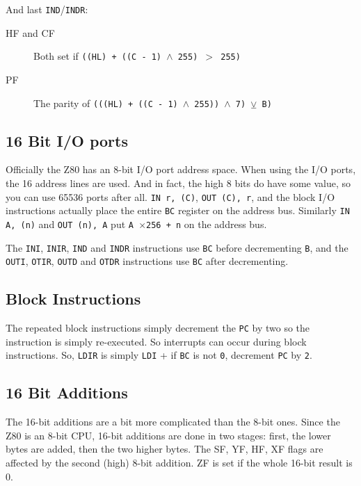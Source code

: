 And last {\tt IND}/{\tt INDR}:

\begin{description}

	\item[HF and CF]
	Both set if {\tt ((HL) + ((C - 1) $\wedge$ 255) $>$ 255)}

	\item[PF]
	The parity of {\tt (((HL) + ((C - 1) $\wedge$ 255)) $\wedge$ 7) $\veebar$ B)}

\end{description}


\subsection{16 Bit I/O ports}

Officially the Z80 has an 8-bit I/O port address space. When using the I/O ports, the 16 address lines are used. And in fact, the high 8 bits do have some value, so you can use 65536 ports after all. {\tt IN r, (C)}, {\tt OUT (C), r}, and the block I/O instructions actually place the entire {\tt BC} register on the address bus. Similarly {\tt IN A, (n)} and {\tt OUT (n), A} put {\tt A $\times$256 + n} on the address bus.

The {\tt INI}, {\tt INIR}, {\tt IND} and {\tt INDR} instructions use {\tt BC} before decrementing {\tt B}, and the {\tt OUTI}, {\tt OTIR}, {\tt OUTD} and {\tt OTDR} instructions use {\tt BC} after decrementing.


\subsection{Block Instructions}

The repeated block instructions simply decrement the {\tt PC} by two so the instruction is simply re-executed. So interrupts can occur during block instructions. So, {\tt LDIR} is simply {\tt LDI} + if {\tt BC} is not {\tt 0}, decrement {\tt PC} by {\tt 2}.


\subsection{16 Bit Additions}

The 16-bit additions are a bit more complicated than the 8-bit ones. Since the Z80 is an 8-bit CPU, 16-bit additions are done in two stages: first, the lower bytes are added, then the two higher bytes. The SF, YF, HF, XF flags are affected by the second (high) 8-bit addition. ZF is set if the whole 16-bit result is 0.


